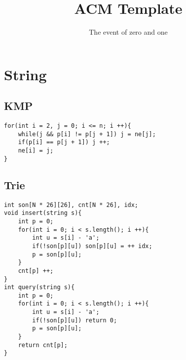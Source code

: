 \documentclass[twocolumn,a4]{article}
\title{\vspace{4cm}\Huge\bfseries ACM Template}
\author{\vspace{2cm}The event of zero and one}
\begin{document}
\begin{titlepage}
\maketitle
\end{titlepage}

\newpage
\pagestyle{empty}
\tableofcontents
\newpage\clearpage
\newpage
\pagestyle{fancy}
\setcounter{page}{1}   %

\section{String}
\subsection{KMP}
\begin{lstlisting}
for(int i = 2, j = 0; i <= n; i ++){
    while(j && p[i] != p[j + 1]) j = ne[j];
    if(p[i] == p[j + 1]) j ++;
    ne[i] = j;
}
\end{lstlisting}

\subsection{Trie}
\begin{lstlisting}
int son[N * 26][26], cnt[N * 26], idx;
void insert(string s){
    int p = 0;
    for(int i = 0; i < s.length(); i ++){
        int u = s[i] - 'a';
        if(!son[p][u]) son[p][u] = ++ idx;
        p = son[p][u];
    }
    cnt[p] ++;
}
int query(string s){
    int p = 0;
    for(int i = 0; i < s.length(); i ++){
        int u = s[i] - 'a'; 
        if(!son[p][u]) return 0;
        p = son[p][u];
    }
    return cnt[p];
}
\end{lstlisting}
\end{document}
